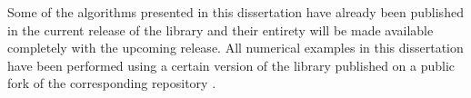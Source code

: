 Some of the algorithms presented in this dissertation have already been published in the current release of the \dealii{} library \parencite{arndt2019} and their entirety will be made available completely with the upcoming release. All numerical examples in this dissertation have been performed using a certain version of the library published on a public fork \textcite{finaldissertation} of the corresponding \dealii{} repository \textcite{dealii920pre}.
